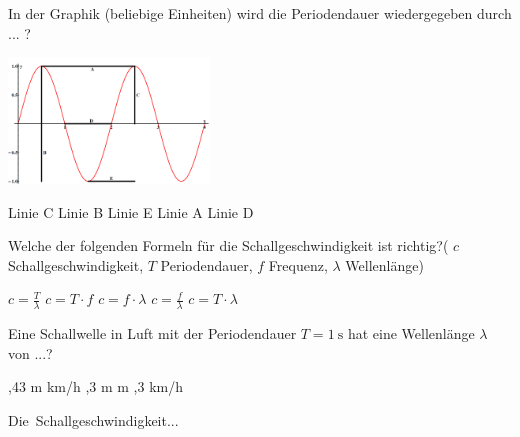 \documentclass[11pt]{exam}
\begin{document}
\setlength{\voffset}{-0.5in}
\setlength{\headsep}{5pt}

\hspace{2mm}
 \hspace{5mm}
\vspace{4mm}

\begin{questions}

\question In der Graphik (beliebige Einheiten) wird die Periodendauer wiedergegeben durch ... ? 

\includegraphics[width=0.4\textwidth]{images/Sinuskurve.png}

\begin{choices}
	\choice Linie C
	\choice Linie B
	\choice Linie E
	\choice Linie A
	\choice Linie D
\end{choices}

\vspace{3mm}\question Welche der folgenden Formeln für die Schallgeschwindigkeit ist richtig?( \( c \) Schallgeschwindigkeit, \(T \) Periodendauer, \( f \) Frequenz, \( \lambda \) Wellenlänge)

\begin{choices}
	\choice \( c=\frac{T}{\lambda} \)
	\choice \( c=T \cdot f \)
	\choice \( c=f \cdot \lambda \)
	\choice \( c=\frac{f}{\lambda} \)
	\choice \( c=T \cdot \lambda \)
\end{choices}

\vspace{3mm}\question Eine Schallwelle in Luft mit der Periodendauer \( T= \mathrm{1~s} \) hat eine Wellenlänge \( \lambda \) von ...?

\begin{choices}
	,43 m
	 km/h
	,3 m
	 m
	,3 km/h
\end{choices}

\vspace{3mm}\question Die Schallgeschwindigkeit...


\end{questions}
\end{document}
